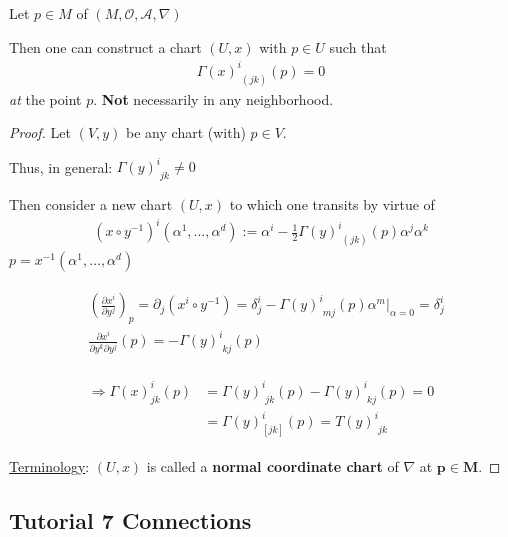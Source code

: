 Let $p \in M$ of $(M, \mathcal{O}, \mathcal{A}, \nabla)$

Then one can construct a chart $(U,x)$ with $p\in U$ such that 
\[
\begin{gathered}
	\Gamma(x)^i_{\,\, (jk)}(p) = 0
\end{gathered} 
\]
\emph{at} the point $p$. \textbf{Not} necessarily in any neighborhood.

\begin{proof}
Let $(V,y)$ be any chart (with) $p\in V$.

Thus, in general: $\Gamma(y)^i_{\,\, jk} \neq 0$

Then consider a new chart $(U, x)$ to which one transits by virtue of 
\[
\begin{gathered}
(x\circ y^{-1})^{i}(\alpha^1, \dots, \alpha^d) := \alpha^i - \frac{1}{2} \Gamma(y)^i_{\,\, (jk)}(p) \alpha^j \alpha^k 
\end{gathered}
\]
$p = x^{-1}(\alpha^1, \dots , \alpha^d)$

\[
\begin{gathered}
\begin{aligned} 
	& \left(\frac{\partial x^i}{ \partial y^j}\right)_p = \partial_j (x^i \circ y^{-1}) = \delta^i_j - \Gamma(y)^i_{\,\, mj}(p) \left. \alpha^m \right|_{\alpha = 0} = \delta^i_j \\
	& \frac{\partial x^i}{ \partial y^k \partial y^j}(p) = - \Gamma(y)^i_{ \, \, kj} (p)
\end{aligned} 
\end{gathered}
\]

\[
\begin{gathered}
\begin{aligned} 
\Longrightarrow \Gamma(x)^i_{jk}(p) & = \Gamma(y)^i_{\,\, jk}(p)  -  \Gamma(y)^i_{\,\,kj}(p) = 0  \\
	& = \Gamma(y)^i_{[jk]}(p) = T(y)^i_{\,\,jk}
\end{aligned} 
\end{gathered}
\]

\underline{Terminology}: $(U,x)$ is called a \textbf{normal coordinate chart} of $\nabla$ at {$\mathbf{p\in M}$}.

\end{proof}


	
	\subsection*{Tutorial 7 Connections}
	
